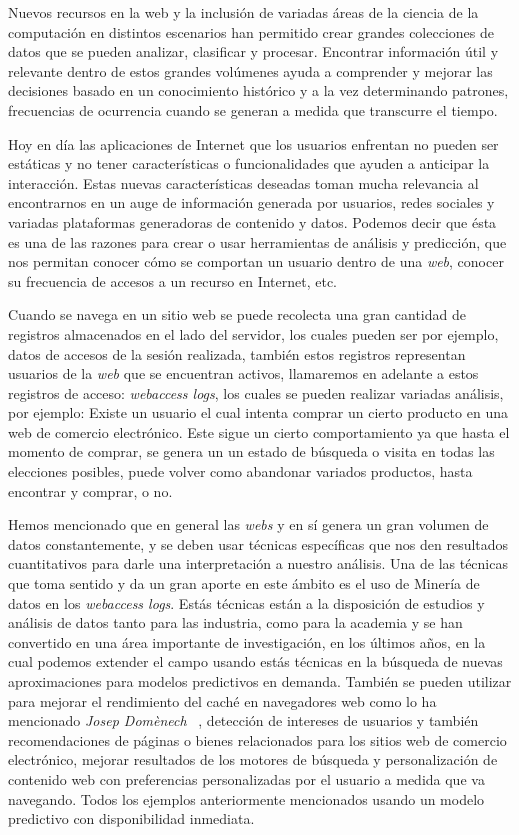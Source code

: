 

Nuevos recursos en la web y la inclusión de variadas áreas de la ciencia de la computación	en distintos escenarios han permitido crear grandes colecciones de datos que se pueden analizar, clasificar y procesar. Encontrar información útil y relevante dentro de estos grandes volúmenes ayuda a comprender y mejorar las decisiones basado en un conocimiento histórico  y a la vez determinando patrones, frecuencias de ocurrencia cuando se generan a medida que transcurre el tiempo. 


Hoy en día las aplicaciones de Internet que los usuarios enfrentan no pueden ser estáticas y no tener características o funcionalidades que ayuden a anticipar la interacción. Estas nuevas características deseadas toman mucha relevancia al encontrarnos en un auge de información generada por usuarios, redes sociales y variadas plataformas generadoras de contenido y datos. Podemos decir que ésta es una de las razones para  crear o usar  herramientas de análisis y predicción, que nos permitan conocer cómo se comportan un usuario  dentro de una \emph{web}, conocer su frecuencia de accesos a un recurso en Internet, etc.

Cuando se navega en un sitio web se puede recolecta una gran cantidad de registros almacenados en el lado del servidor, los cuales pueden ser por ejemplo, datos de accesos de la sesión realizada, también estos  registros representan usuarios de la \emph{web}  que se encuentran activos, llamaremos en adelante a estos registros de acceso: \emph{webaccess logs},   los cuales se pueden realizar variadas análisis, por ejemplo:  Existe un usuario el cual intenta comprar un cierto producto en una web de comercio electrónico. Este sigue un cierto comportamiento ya que hasta el momento de comprar, se genera un un estado de búsqueda o visita en todas las elecciones posibles, puede volver como abandonar variados productos, hasta encontrar y comprar, o no. 

Hemos mencionado  que  en general las \emph{webs}  y en sí \inet genera un gran volumen de datos constantemente, y se deben usar técnicas específicas que nos den resultados cuantitativos para darle una interpretación a nuestro análisis. Una de las técnicas que toma sentido y da un gran aporte en este ámbito es el uso de Minería de datos  en los \emph{webaccess logs}.  Estás técnicas están a la disposición  de estudios y análisis de datos tanto para las industria, como para la academia y  se han convertido en una área importante  de investigación, en los últimos años, en la cual podemos extender el campo usando estás técnicas en la búsqueda de nuevas aproximaciones para modelos predictivos en demanda. También se pueden utilizar para mejorar el rendimiento del caché en navegadores web como lo ha mencionado \emph{Josep Domènech} \etal~\cite{Domenech2006},  detección de intereses de usuarios y también recomendaciones de páginas o bienes relacionados para los sitios {web} de comercio electrónico, mejorar  resultados de los motores de búsqueda y personalización de contenido web con preferencias personalizadas por el usuario a medida que va navegando. Todos los ejemplos anteriormente mencionados usando un modelo predictivo con disponibilidad inmediata.



